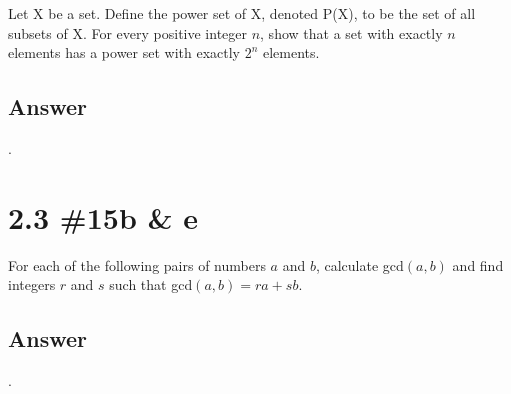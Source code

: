 \documentclass[
	12pt, %
]{fphw}
\begin{document}
\begin{problem}
Let X be a set. Define the power set of X, denoted P(X), to be the set of all subsets of X. For every positive integer $n$, show that a set with exactly $n$ elements has a power set with exactly $2^n$ elements.

\end{problem}


\subsection*{Answer} .\\



\section*{2.3 \#15b \& e}

\begin{problem}
For each of the following pairs of numbers $a$ and $b$, calculate gcd$(a, b)$
and find integers $r$ and $s$ such that gcd$(a, b) = ra + sb$.\end{problem}


\subsection*{Answer} .\\

\end{document}
